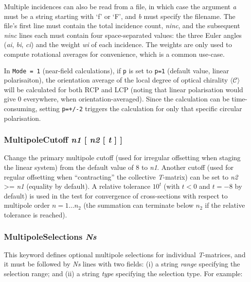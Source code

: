 \documentclass[
]{article}
\begin{document}
Multiple incidences can also be read from a file, in which case the
argument \emph{a} must be a string starting with `f' or `F', and
\emph{b} must specify the filename. The file's first line must contain
the total incidence count, \emph{ninc}, and the subsequent \emph{ninc}
lines each must contain four space-separated values: the three Euler
angles (\emph{ai}, \emph{bi}, \emph{ci}) and the weight \emph{wi} of
each incidence. The weights are only used to compute rotational averages
for convenience, which is a common use-case.

In \texttt{Mode\ =\ 1} (near-field calculations), if \texttt{p} is set
to \texttt{p=1} (default value, linear polarisaiton), the orientation
average of the local degree of optical chirality
\(\langle\mathscr{C}\rangle\) will be calculated for both RCP and LCP
(noting that linear polarisation would give 0 everywhere, when
orientation-averaged). Since the calculation can be time-consuming,
setting \texttt{p=+/-2} triggers the calculation for only that specific
circular polarisation.

\hypertarget{multipolecutoff-n1-n2-t}{%
\subsubsection{\texorpdfstring{MultipoleCutoff \emph{n1} {[} \emph{n2}
{[} \emph{t} {]}
{]}}{MultipoleCutoff n1 {[} n2 {[} t {]} {]}}}\label{multipolecutoff-n1-n2-t}}

Change the primary multipole cutoff (used for irregular offsetting when
staging the linear system) from the default value of 8 to \emph{n1}.
Another cutoff (used for regular offsetting when ``contracting'' the
collective \emph{T}-matrix) can be set to \emph{n2} \textgreater=
\emph{n1} (equality by default). A relative tolerance \(10^t\) (with
\(t<0\) and \(t = -8\) by default) is used in the test for convergence
of cross-sections with respect to multipole order \(n=1\dots n_2\) (the
summation can terminate below \(n_2\) if the relative tolerance is
reached).

\hypertarget{multipoleselections-ns}{%
\subsubsection{\texorpdfstring{MultipoleSelections
\emph{Ns}}{MultipoleSelections Ns}}\label{multipoleselections-ns}}

This keyword defines optional multipole selections for individual
\emph{T}-matrices, and it must be followed by \emph{Ns} lines with two
fields: (i) a string \emph{range} specifying the selection range; and
(ii) a string \emph{type} specifying the selection type. For example:
\end{document}
